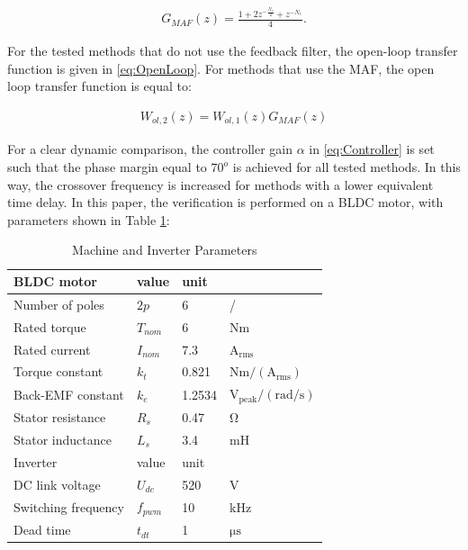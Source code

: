 \documentclass[conference]{IEEEtran}
\begin{document}
\begin{equation}
\begin{aligned}
G_{MAF}(z) = \frac{1 + 2z^{-\frac{N_c}{2}} + z^{-N_c}}{4}.
\label{eq:MAF} 
\end{aligned}    
\end{equation}

For the tested methods that do not use the feedback filter, the open-loop transfer function is given in \eqref{eq:OpenLoop}. For methods that use the MAF, the open loop transfer function is equal to:

\begin{equation}
\begin{aligned}
W_{ol,2}(z) = W_{ol,1}(z) G_{MAF}(z)
\label{eq:OpenLoop_MAF} 
\end{aligned}    
\end{equation}

For a clear dynamic comparison, the controller gain $\alpha$ in \eqref{eq:Controller} is set such that the phase margin equal to $70^o$ is achieved for all tested methods. In this way, the crossover frequency is increased for methods with a lower equivalent time delay. 
In this paper, the verification is performed on a BLDC motor, with parameters shown in Table \ref{tab:motor_param}:

\begin{table}[h!]
			  \caption{Machine and Inverter Parameters}
              \label{tab:motor_param}
              \centering
              \begin{tabular}{llll}
                           \midrule\midrule
        BLDC motor & value   & unit\\
        \midrule               
                  Number of poles	& $2p$ & 6 & /\\
                  Rated torque  & $T_{nom}$ & 6 &  $\mathrm{Nm}$  \\
                  Rated current  & $I_{nom}$ & 7.3 &  $\mathrm{A_{rms}}$  \\
                  Torque constant  & $k_{t}$ & 0.821 & $\mathrm{Nm/(A_{rms})}$   \\
                  Back-EMF constant  & $k_{e}$ & 1.2534 & $\mathrm{V_{peak}/(rad/s)}$   \\
                  Stator resistance  & $R_{s}$ & 0.47 & $\mathrm{\Omega}$   \\
                  Stator inductance  & $L_{s}$ & 3.4 & mH   \\
                  \midrule\midrule

        Inverter & value   & unit\\
        \midrule               
                  DC link voltage	& $U_{dc}$ & 520 & V \\  
                  Switching frequency  & $f_{pwm}$ & 10 & kHz   \\
                  Dead time  & $t_{dt}$ & 1 &  $\mathrm{\mu s}$  \\
                  \midrule\midrule
                                                        
              \end{tabular}
\end{table}
\end{document}
